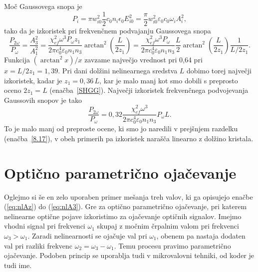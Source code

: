 Moč Gaussovega snopa je
\begin{equation}
P_{i}=\pi w_{i0}^{2} \frac{1}{2}c_0 n_i \epsilon_{0}E_{i0}^{2}=
\frac{\pi}{2}w_{i0}^{2}\varepsilon_0 c_0 \omega_{i} A_{i}^{2},
\label{8.26}
\end{equation}
tako da je izkoristek pri frekvenčnem podvajanju Gaussovega snopa 
\begin{equation}
\frac{P_{2\omega}}{P_{\omega}}=\frac{A_3^2}{A_1^2} = 
\frac{\chi_{ef}^2 \omega^3 P_\omega z_1}{2 \pi c_0^4 \varepsilon_0 n_1 n_3} 
\arctan^2 \left( \frac{L}{2z_1}\right)
= \frac{\chi_{ef}^2 \omega^3 P_\omega}{2 \pi c_0^4 \varepsilon_0 n_1 n_3} \frac{L}{2}
\arctan^2 \left( \frac{L}{2z_1}\right) \frac{1}{L/2z_1}.
\label{8.27}
\end{equation}
Funkcija $(\arctan^{2}x)/x$ zavzame največjo vrednost pri 0,64 pri $x =L/2z_1=1,39$.
Pri dani dolžini nelinearnega sredstva $L$ dobimo torej največji
izkoristek, kadar je $z_{1}=0,36\,L$, kar je malo manj kot smo dobili
s preprosto oceno $2z_{1}=L$ (enačba~\ref{SHGG}). Največji izkoristek
frekvenčnega podvojevanja Gaussovih snopov je tako
\begin{equation}
\frac{P_{2\omega}}{P_{\omega}}
= 0,32 \frac{\chi_{ef}^2 \omega^3 }{2 \pi c_0^4 \varepsilon_0 n_1 n_3} P_\omega L.
\label{8.28}
\end{equation}
To je malo manj od preproste ocene, ki smo jo naredili v prejšnjem razdelku (enačba~\ref{8.17}),
v obeh primerih pa izkoristek narašča linearno z dolžino kristala.

\section{Optično parametrično ojačevanje}

Oglejmo si še en zelo uporaben primer mešanja treh valov, 
ki ga opisujejo enačbe (\ref{eq:nlAz}) do (\ref{eq:nlA3}). Gre za
optično parametrično ojačevanje, pri katerem nelinearne optične pojave
izkoristimo za ojačevanje optičnih signalov. Imejmo vhodni
signal pri frekvenci $\omega_{1}$ skupaj z močnim črpalnim valom
pri frekvenci $\omega_{3}>\omega_{1}$. Zaradi nelinearnosti se ojačuje
val pri $\omega_{1}$, obenem pa nastaja dodaten val pri razliki frekvenc
$\omega_{2}=\omega_{3}-\omega_{1}$. Temu procesu pravimo parametrično
ojačevanje. Podoben princip se uporablja tudi v mikrovalovni tehniki,
od koder je tudi ime.

